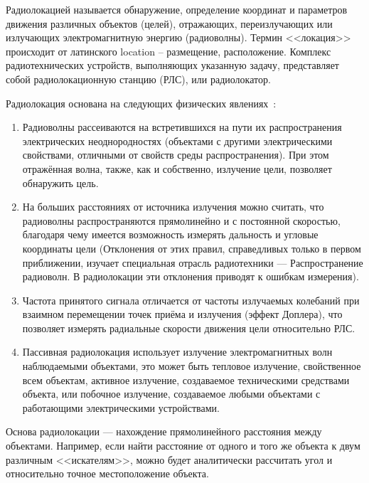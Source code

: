 Радиолокацией называется обнаружение, определение координат и параметров движения различных объектов (целей), отражающих, переизлучающих или излучающих электромагнитную энергию (радиоволны). Термин <<локация>> происходит от латинского location – размещение, расположение. Комплекс радиотехнических устройств, выполняющих указанную задачу, представляет собой радиолокационную станцию (РЛС), или радиолокатор.

Радиолокация основана на следующих физических явлениях~\cite{wiki:radiolocation}:

\begin{enumerate}
    \item Радиоволны рассеиваются на встретившихся на пути их распространения электрических неоднородностях (объектами с другими электрическими свойствами, отличными от свойств среды распространения). При этом отражённая волна, также, как и собственно, излучение цели, позволяет обнаружить цель.
    \item На больших расстояниях от источника излучения можно считать, что радиоволны распространяются прямолинейно и с постоянной скоростью, благодаря чему имеется возможность измерять дальность и угловые координаты цели (Отклонения от этих правил, справедливых только в первом приближении, изучает специальная отрасль радиотехники --- Распространение радиоволн. В радиолокации эти отклонения приводят к ошибкам измерения).
    \item Частота принятого сигнала отличается от частоты излучаемых колебаний при взаимном перемещении точек приёма и излучения (эффект Доплера), что позволяет измерять радиальные скорости движения цели относительно РЛС.
    \item Пассивная радиолокация использует излучение электромагнитных волн наблюдаемыми объектами, это может быть тепловое излучение, свойственное всем объектам, активное излучение, создаваемое техническими средствами объекта, или побочное излучение, создаваемое любыми объектами с работающими электрическими устройствами.
\end{enumerate}

Основа радиолокации --- нахождение прямолинейного расстояния между объектами. Например, если найти расстояние от одного и того же объекта к двум различным <<искателям>>, можно будет аналитически рассчитать угол и относительно точное местоположение объекта.
